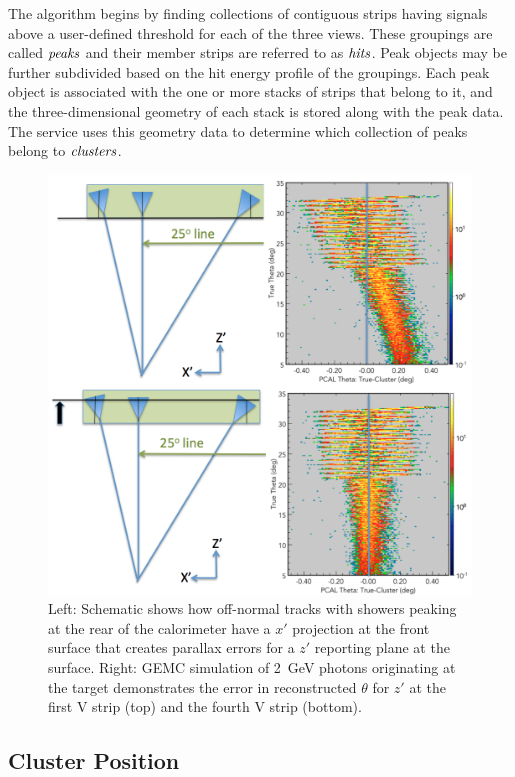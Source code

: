 The algorithm begins by finding collections of contiguous strips having signals above a user-defined threshold for
each of the three views. These groupings are called ${\it peaks}$ and their member strips are referred to as
${\it hits}$. Peak objects may be further subdivided based on the hit energy profile of the groupings. Each peak
object is associated with the one or more stacks of strips that belong to it, and the three-dimensional geometry of
each stack is stored along with the peak data. The service uses this geometry data to determine which collection
of peaks belong to ${\it clusters}$. 

\begin{figure}[hbt]
\centering
\includegraphics[width=0.95\columnwidth,keepaspectratio]{img/S6_1.png}
\caption{Left: Schematic shows how off-normal tracks with showers peaking at the rear of the calorimeter have
  a $x'$ projection at the front surface that creates parallax errors for a $z'$ reporting plane at the surface.
  Right: GEMC simulation of 2~GeV photons originating at the target demonstrates the error in reconstructed
  $\theta$ for $z'$ at the first V strip (top) and the fourth V strip (bottom).}
\label{fig:S6_1}
\end{figure}

\subsection {Cluster Position}

